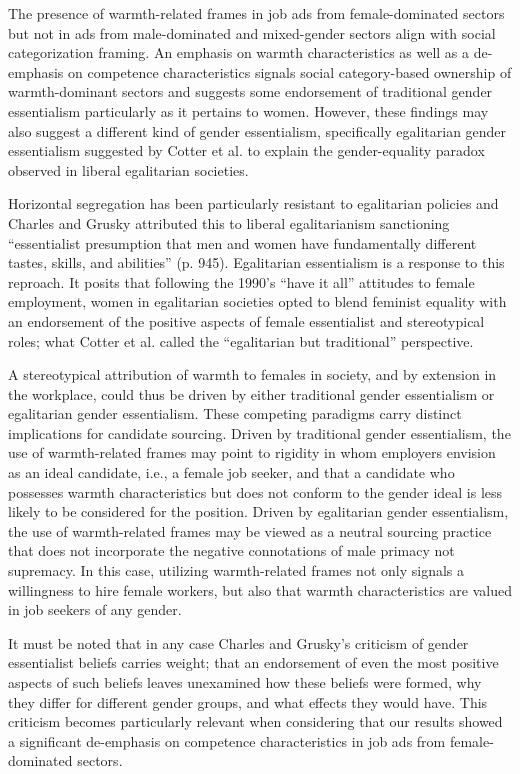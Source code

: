 \documentclass[Royal,sageapa,times]{sagej}
\begin{document}
The presence of warmth-related frames in job ads from female-dominated sectors but not in ads from male-dominated and mixed-gender sectors align with social categorization framing. An emphasis on warmth characteristics as well as a de-emphasis on competence characteristics signals social category-based ownership of warmth-dominant sectors and suggests some endorsement of traditional gender essentialism particularly as it pertains to women. However, these findings may also suggest a different kind of gender essentialism, specifically egalitarian gender essentialism suggested by Cotter et al. \citeyear{cotterEndGenderRevolution2011} to explain the gender-equality paradox observed in liberal egalitarian societies.

Horizontal segregation has been particularly resistant to egalitarian policies and Charles and Grusky \citeyear{charlesEgalitarianismGenderInequality2011} attributed this to liberal egalitarianism sanctioning “essentialist presumption that men and women have fundamentally different tastes, skills, and abilities” (p. 945). Egalitarian essentialism is a response to this reproach. It posits that following the 1990’s “have it all” attitudes to female employment, women in egalitarian societies opted to blend feminist equality with an endorsement of the positive aspects of female essentialist and stereotypical roles; what Cotter et al. called the “egalitarian but traditional” perspective.

A stereotypical attribution of warmth to females in society, and by extension in the workplace, could thus be driven by either traditional gender essentialism or egalitarian gender essentialism. These competing paradigms carry distinct implications for candidate sourcing. Driven by traditional gender essentialism, the use of warmth-related frames may point to rigidity in whom employers envision as an ideal candidate, i.e., a female job seeker, and that a candidate who possesses warmth characteristics but does not conform to the gender ideal is less likely to be considered for the position. Driven by egalitarian gender essentialism, the use of warmth-related frames may be viewed as a neutral sourcing practice that does not incorporate the negative connotations of male primacy not supremacy. In this case, utilizing warmth-related frames not only signals a willingness to hire female workers, but also that warmth characteristics are valued in job seekers of any gender.

It must be noted that in any case Charles and Grusky’s \citeyear{cotterEndGenderRevolution2011} criticism of gender essentialist beliefs carries weight; that an endorsement of even the most positive aspects of such beliefs leaves unexamined how these beliefs were formed, why they differ for different gender groups, and what effects they would have. This criticism becomes particularly relevant when considering that our results showed a significant de-emphasis on competence characteristics in job ads from female-dominated sectors.
\end{document}
